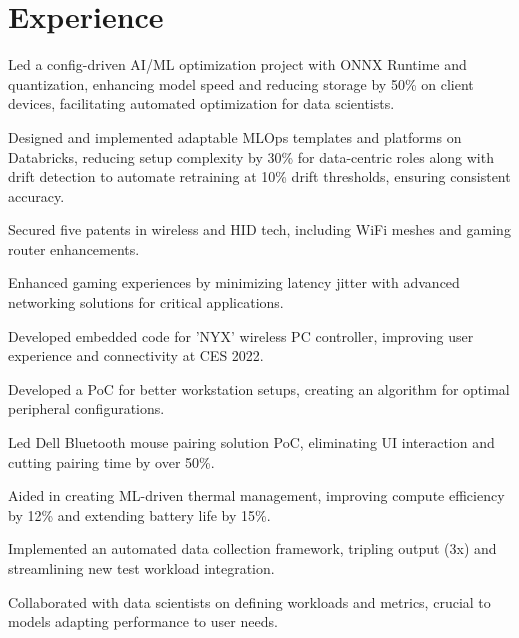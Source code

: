 \documentclass[]{resume-openfont}
\begin{document}
\begin{minipage}[t]{1\textwidth}
\section{Experience}
\titlerule
\vspace{2.5 mm}

\vspace{\topsep}
\begin{tightemize}
    \item Led a config-driven AI/ML optimization project with ONNX Runtime and quantization, enhancing model speed and reducing storage by 50\% on client devices, facilitating automated optimization for data scientists.
    \item Designed and implemented adaptable MLOps templates and platforms on Databricks, reducing setup complexity by 30\% for data-centric roles along with drift detection to automate retraining at 10\% drift thresholds, ensuring consistent accuracy.
    \item Secured five patents in wireless and HID tech, including WiFi meshes and gaming router enhancements.
    \item Enhanced gaming experiences by minimizing latency jitter with advanced networking solutions for critical applications.
    \item Developed embedded code for 'NYX' wireless PC controller, improving user experience and connectivity at CES 2022.
    \item Developed a PoC for better workstation setups, creating an algorithm for optimal peripheral configurations.    
\end{tightemize}
\begin{tightemize}
    \item Led Dell Bluetooth mouse pairing solution PoC, eliminating UI interaction and cutting pairing time by over 50\%.
    \item Aided in creating ML-driven thermal management, improving compute efficiency by 12\% and extending battery life by 15\%.
    \item Implemented an automated data collection framework, tripling output (3x) and streamlining new test workload integration.
    \item Collaborated with data scientists on defining workloads and metrics, crucial to models adapting performance to user needs.
\end{tightemize}
\sectionsep


\end{minipage}
\end{document}
